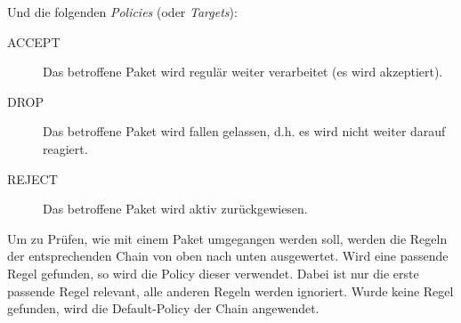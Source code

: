 			Und die folgenden \textit{Policies} (oder \textit{Targets}):
			\begin{description}
				\item[ACCEPT] Das betroffene Paket wird regulär weiter verarbeitet (es wird akzeptiert).
				\item[DROP]   Das betroffene Paket wird fallen gelassen, d.h. es wird nicht weiter darauf reagiert.
				\item[REJECT] Das betroffene Paket wird aktiv zurückgewiesen.
			\end{description}

			Um zu Prüfen, wie mit einem Paket umgegangen werden soll, werden die Regeln der entsprechenden Chain von oben nach unten ausgewertet. Wird eine passende Regel gefunden, so wird die Policy dieser verwendet. Dabei ist nur die erste passende Regel relevant, alle anderen Regeln werden ignoriert. Wurde keine Regel gefunden, wird die Default-Policy der Chain angewendet.

